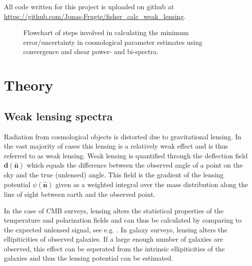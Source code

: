 \documentclass[11pt]{article} %
\begin{document}
All code written for this project is uploaded on github at \url{https://github.com/Jonas-Frugte/fisher_calc_weak_lensing}.



\begin{figure}[h!]
    \centering
    
    \caption{Flowchart of steps involved in calculating the minimum error/uncertainty in cosmological parameter estimates using convergence and shear power- and bi-spectra.}
    \label{fig:flowchart}
\end{figure}

\section{Theory}
\label{sec:theory}
\subsection{Weak lensing spectra}
Radiation from cosmological objects is distorted due to gravitational lensing. In the vast majority of cases this lensing is a relatively weak effect and is thus referred to as weak lensing. Weak lensing is quantified through the deflection field $\mathbf d(\hat {\mathbf n})$ which equals the difference between the observed angle of a point on the sky and the true (unlensed) angle. This field is the gradient of the lensing potential $\psi(\hat {\mathbf n})$ given as a weighted integral over the mass distribution along the line of sight between earth and the observed point.

In the case of CMB surveys, lensing alters the statistical properties of the temperature and polarization fields and can thus be calculated by comparing to the expected unlensed signal, see e.g. \cite{cmblensingestimator}. In galaxy surveys, lensing alters the ellipiticities of observed galaxies. If a large enough number of galaxies are observed, this effect can be seperated from the intrinsic ellipiticities of the galaxies and thus the lensing potential can be estimated.
\end{document}

